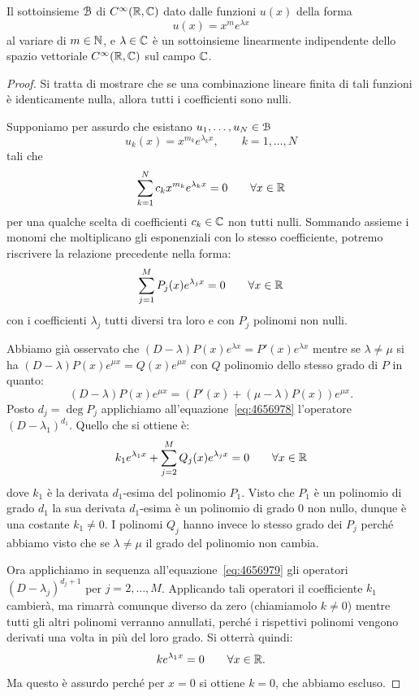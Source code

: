 \begin{theorem}
\mymark{***}
Il sottoinsieme $\mathcal B$ di $C^\infty({\mathbb R}, {\mathbb C})$ dato dalle funzioni $u(x)$ della forma
\[
   u(x) = x^m e^{\lambda x}
\]
al variare di $m\in {\mathbb N}$, e $\lambda \in {\mathbb C}$ è un sottoinsieme linearmente indipendente
dello spazio vettoriale $C^\infty({\mathbb R},{\mathbb C})$ sul campo ${\mathbb C}$.
\end{theorem}
%
\begin{proof}
Si tratta di mostrare che se una combinazione lineare finita di tali funzioni
è identicamente nulla, allora tutti i coefficienti sono nulli.

Supponiamo per assurdo che esistano
$u_1, \dots, u_N\in \mathcal B$
\[
  u_k(x) = x^{m_k} e^{\lambda_k x}, \qquad k=1, \dots, N
\]
tali che
\[
\sum_{k=1}^N c_k x^{m_k} e^{\lambda_k x} = 0
  \qquad \forall x \in {\mathbb R}
\]
per una qualche scelta di coefficienti $c_k \in {\mathbb C}$ non tutti nulli.
Sommando assieme i monomi che moltiplicano gli esponenziali con lo stesso
coefficiente, potremo riscrivere la relazione precedente nella forma:
\begin{equation}\label{eq:4656978}
  \sum_{j=1}^M P_j(x) e^{\lambda_j x} = 0 \qquad \forall x\in {\mathbb R}
\end{equation}
con i coefficienti $\lambda_j$ tutti diversi tra loro e con
$P_j$ polinomi non nulli.

Abbiamo già osservato che $(D-\lambda)P(x)e^{\lambda x}= P'(x)e^{\lambda x}$
mentre se $\lambda\neq \mu$ si ha $(D-\lambda)P(x) e^{\mu x} = Q(x) e^{\mu x}$
con $Q$ polinomio dello stesso grado di $P$ in quanto:
\[
(D-\lambda) P(x) e^{\mu x} = (P'(x) + (\mu-\lambda) P(x)) e^{\mu x}.  
\]
Posto $d_j = \deg P_j$ applichiamo all'equazione~\eqref{eq:4656978}
l'operatore $(D-\lambda_1)^{d_1}$.
Quello che si ottiene è:
\begin{equation}\label{eq:4656979}
  k_1 e^{\lambda_1 x} + \sum_{j=2}^M Q_j(x) e^{\lambda_j x} = 0 \qquad \forall x\in {\mathbb R}
\end{equation}
dove $k_1$ è la derivata $d_1$-esima del polinomio $P_1$.
Visto che $P_1$ è un polinomio di grado $d_1$ la sua derivata
$d_1$-esima è un polinomio di grado $0$ non nullo,
dunque è una costante $k_1 \neq 0$.
I polinomi $Q_j$ hanno invece lo stesso grado dei $P_j$ perché abbiamo visto
che se $\lambda\neq \mu$ il grado del polinomio non cambia.

Ora applichiamo in sequenza all'equazione~\eqref{eq:4656979} gli operatori
$(D-\lambda_j)^{d_j+1}$ per $j=2,\dots, M$.
Applicando tali operatori il coefficiente $k_1$ cambierà, ma rimarrà comunque
diverso da zero (chiamiamolo $k\neq 0$) mentre tutti gli altri polinomi
verranno annullati, perché i rispettivi polinomi vengono derivati una volta in
più del loro grado. Si otterrà quindi:
\[
  k e^{\lambda_1 x} = 0 \qquad \forall x\in {\mathbb R}.
\]
Ma questo è assurdo perché per $x=0$ si ottiene $k=0$, che abbiamo escluso.
\end{proof}

